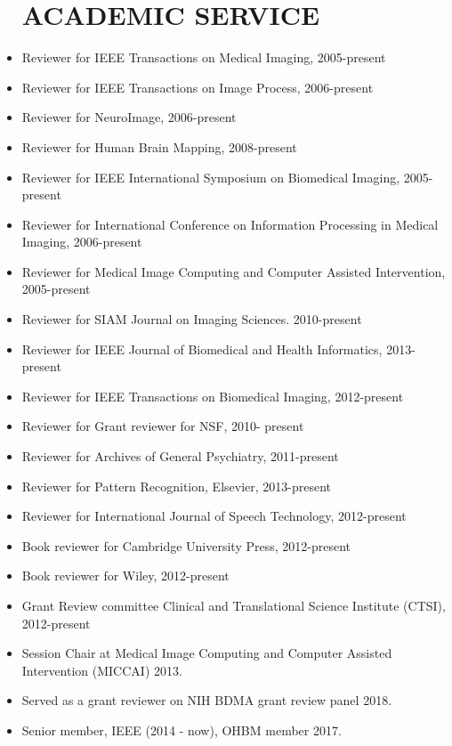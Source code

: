 \documentclass[overlapped,line,letterpaper]{res}
\begin{document}
\begin{resume}
\begin{itemize}
\section{\bf ACADEMIC SERVICE}
\item Reviewer for IEEE Transactions on Medical Imaging, 2005-present
\item Reviewer for IEEE Transactions on Image Process,  2006-present 
\item Reviewer for NeuroImage,  2006-present
\item Reviewer for Human Brain Mapping,  2008-present 
\item  Reviewer for IEEE International Symposium on Biomedical Imaging,  2005-present
\item Reviewer for International Conference on Information Processing in Medical Imaging, 2006-present
\item Reviewer for Medical Image Computing and Computer Assisted Intervention, 2005-present 
\item Reviewer for SIAM Journal on Imaging Sciences. 2010-present
\item Reviewer for IEEE Journal of Biomedical and Health Informatics, 2013-present
\item Reviewer for IEEE Transactions on Biomedical Imaging, 2012-present
\item Reviewer for Grant reviewer for NSF, 2010- present 
\item Reviewer for Archives of General Psychiatry, 2011-present
\item Reviewer for Pattern Recognition, Elsevier, 2013-present
\item Reviewer for International Journal of Speech Technology, 2012-present
\item Book reviewer for Cambridge University Press, 2012-present
\item Book reviewer for Wiley, 2012-present
\item Grant Review committee Clinical and Translational Science Institute (CTSI), 2012-present
\item Session Chair at Medical Image Computing and Computer Assisted Intervention (MICCAI) 2013.
\item Served as a grant reviewer on NIH BDMA grant review panel 2018.
\item Senior member, IEEE (2014 - now), OHBM member 2017.
\end{itemize}


\end{resume}
\end{document}

